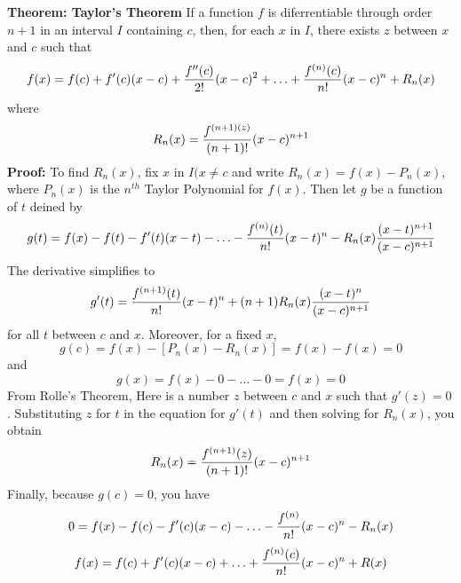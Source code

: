 \nopagenumbers
{\bf Theorem: Taylor's Theorem}
\vskip 6pt
If a function $f$ is diferrentiable through order $n+1$ in an interval $I$ containing $c$, then, for each $x$ in $I$, there exists $z$ between $x$ and $c$ such that $$f(x)=f(c)+f'(c)(x-c)+{f''(c)\over 2!}(x-c)^2+\ldots + {f^{(n)}(c)\over n!}(x-c)^n+R_n(x)$$ where $$R_n(x)={{f^{(n+1)(z)}\over (n+1)!}(x-c)^{n+1}}$$
\vskip 10pt
{\bf Proof:}
\vskip 6pt
To find $R_n(x)$, fix $x$ in $I(x\neq c$ and write $R_n(x)=f(x)-P_n(x)$, where $P_n(x)$ is the $n^{th}$ Taylor Polynomial for $f(x)$. Then let $g$ be a function of $t$ deined by $$g(t)=f(x)-f(t)-f'(t)(x-t)-\ldots - {f^{(n)}(t)\over n!}(x-t)^n-R_n(x){{(x-t)^{n+1}}\over (x-c)^{n+1}}$$ The derivative simplifies to $$g'(t)={f^{(n+1)}(t)\over n!}(x-t)^n+(n+1)R_n(x){(x-t)^n\over (x-c)^{n+1}}$$ for all $t$ between $c$ and $x$.
\vskip 1mm
Moreover, for a fixed $x$, $$g(c)=f(x)-[P_n(x)-R_n(x)]=f(x)-f(x)=0$$ and $$g(x)=f(x)-0-\ldots -0=f(x)=0$$ From Rolle's Theorem, Here is a number $z$ between $c$ and $x$ such that $g'(z)=0$. Substituting $z$ for $t$ in the equation for $g'(t)$ and then solving for $R_n(x)$, you obtain $$R_n(x)={{f^{(n+1)}(z)\over (n+1)!}(x-c)^{n+1}}$$ Finally, because $g(c)=0$, you have $$0=f(x)-f(c)-f'(c)(x-c)-\ldots-{f^{(n)}\over n!}(x-c)^n-R_n(x)$$ $$f(x)=f(c)+f'(c)(x-c)+\ldots+{f^{(n)}(c)\over n!}(x-c)^n+R(x)$$
\vfill\eject
